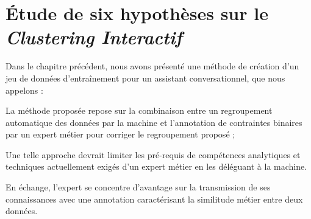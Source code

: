 \chapter{Étude de six hypothèses sur le \textit{Clustering Interactif}}
\label{chapter:4-ETUDES}
	
	Dans le chapitre précédent, nous avons présenté une méthode de création d'un jeu de données d'entraînement pour un assistant conversationnel, que nous appelons  :
	\begin{leftBarImportantGreen}
		\begin{todolist}
			\item[\itemok] La méthode proposée repose sur la combinaison entre un regroupement automatique des données par la machine et l'annotation de contraintes binaires par un expert métier pour corriger le regroupement proposé ;
			\item[\itemok] Une telle approche devrait limiter les pré-requis de compétences analytiques et techniques actuellement exigés d'un expert métier en les déléguant à la machine.
			\item[\itemok] En échange, l'expert se concentre d'avantage sur la transmission de ses connaissances avec une annotation caractérisant la similitude métier entre deux données.
		\end{todolist}
	\end{leftBarImportantGreen}
	
